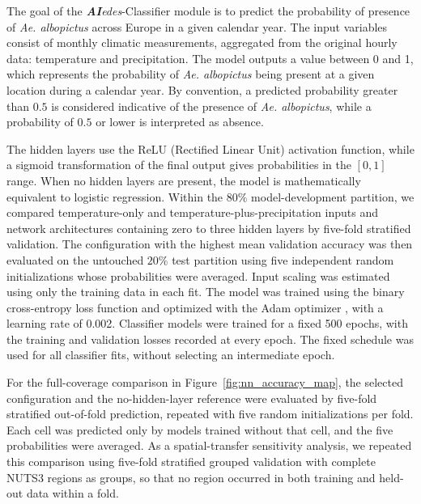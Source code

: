 \documentclass[preprint,12pt]{elsarticle}
\begin{document}
The goal of the \textit{\textbf{AI}edes}-Classifier module is to predict the probability of presence  of \emph{Ae. albopictus} across Europe in a given calendar year. The input variables consist of monthly climatic measurements, aggregated from the original hourly data: temperature and precipitation. The model outputs a value between 0 and 1, which represents the probability of \emph{Ae. albopictus} being present at a given location during a calendar year. By convention, a predicted probability greater than $0.5$ is considered indicative of the presence of \emph{Ae. albopictus}, while a probability of $0.5$ or lower is interpreted as absence.

The hidden layers use the ReLU (Rectified Linear Unit) activation function, while a sigmoid transformation of the final output gives probabilities in the $[0,1]$ range. When no hidden layers are present, the model is mathematically equivalent to logistic regression. Within the $80\%$ model-development partition, we compared temperature-only and temperature-plus-precipitation inputs and network architectures containing zero to three hidden layers by five-fold stratified validation. The configuration with the highest mean validation accuracy was then evaluated on the untouched $20\%$ test partition using five independent random initializations whose probabilities were averaged. Input scaling was estimated using only the training data in each fit.
The model was trained using the binary cross-entropy loss function \cite{bishop2006pattern} and optimized with the Adam optimizer \cite{kingma2014adam}, with a learning rate of 0.002. Classifier models were trained for a fixed 500 epochs, with the training and validation losses recorded at every epoch. The fixed schedule was used for all classifier fits, without selecting an intermediate epoch.

For the full-coverage comparison in Figure~\ref{fig:nn_accuracy_map}, the selected configuration and the no-hidden-layer reference were evaluated by five-fold stratified out-of-fold prediction, repeated with five random initializations per fold. Each cell was predicted only by models trained without that cell, and the five probabilities were averaged. As a spatial-transfer sensitivity analysis, we repeated this comparison using five-fold stratified grouped validation with complete NUTS3 regions as groups, so that no region occurred in both training and held-out data within a fold.
\end{document}
